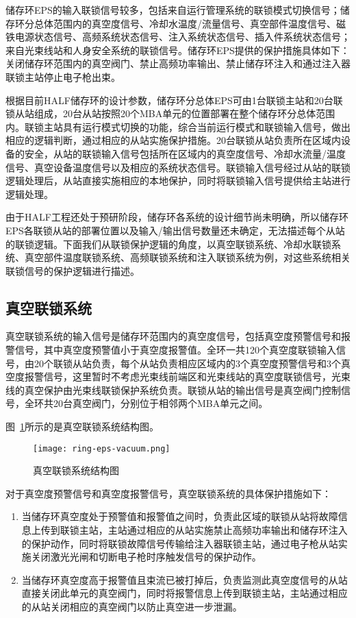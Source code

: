 储存环EPS的输入联锁信号较多，包括来自运行管理系统的联锁模式切换信号；储存环分总体范围内的真空度信号、冷却水温度/流量信号、真空部件温度信号、磁铁电源状态信号、高频系统状态信号、注入系统状态信号、插入件系统状态信号；来自光束线站和人身安全系统的联锁信号。储存环EPS提供的保护措施具体如下：关闭储存环范围内的真空阀门、禁止高频功率输出、禁止储存环注入和通过注入器联锁主站停止电子枪出束。

根据目前HALF储存环的设计参数，储存环分总体EPS可由1台联锁主站和20台联锁从站组成，20台从站按照20个MBA单元的位置部署在整个储存环分总体范围内。联锁主站具有运行模式切换的功能，综合当前运行模式和联锁输入信号，做出相应的逻辑判断，通过相应的从站实施保护措施。20台联锁从站负责所在区域内设备的安全，从站的联锁输入信号包括所在区域内的真空度信号、冷却水流量/温度信号、真空设备温度信号以及相应的系统状态信号。联锁输入信号经过从站的联锁逻辑处理后，从站直接实施相应的本地保护，同时将联锁输入信号提供给主站进行逻辑处理。

由于HALF工程还处于预研阶段，储存环各系统的设计细节尚未明确，所以储存环EPS各联锁从站的部署位置以及输入/输出信号数量还未确定，无法描述每个从站的联锁逻辑。下面我们从联锁保护逻辑的角度，以真空联锁系统、冷却水联锁系统、真空部件温度联锁系统、高频联锁系统和注入联锁系统为例，对这些系统相关联锁信号的保护逻辑进行描述。

\subsection{真空联锁系统}

真空联锁系统的输入信号是储存环范围内的真空度信号，包括真空度预警信号和报警信号，其中真空度预警值小于真空度报警值。全环一共120个真空度联锁输入信号，由20个联锁从站负责，每个从站负责相应区域内的3个真空度预警信号和3个真空度报警信号，这里暂时不考虑光束线前端区和光束线站的真空度联锁信号，光束线的真空保护由光束线联锁保护系统负责。联锁从站的输出信号是真空阀门控制信号，全环共20台真空阀门，分别位于相邻两个MBA单元之间。

图~\ref{fig:ring-eps-vacuum}所示的是真空联锁系统结构图。

\begin{figure}[!htb]
	\centering
	\texttt{[image: ring-eps-vacuum.png]}
	\caption{真空联锁系统结构图}
	\label{fig:ring-eps-vacuum}
\end{figure}

对于真空度预警信号和真空度报警信号，真空联锁系统的具体保护措施如下：

\begin{enumerate}

  \item 当储存环真空度处于预警值和报警值之间时，负责此区域的联锁从站将故障信息上传到联锁主站，主站通过相应的从站实施禁止高频功率输出和储存环注入的保护动作，同时将联锁故障信号传输给注入器联锁主站，通过电子枪从站实施关闭激光光闸和切断电子枪时序触发信号的保护动作。

  \item 当储存环真空度高于报警值且束流已被打掉后，负责监测此真空度信号的从站直接关闭此单元的真空阀门，同时将报警信息上传到联锁主站，主站通过相应的从站关闭相应的真空阀门以防止真空进一步泄漏。

\end{enumerate}


